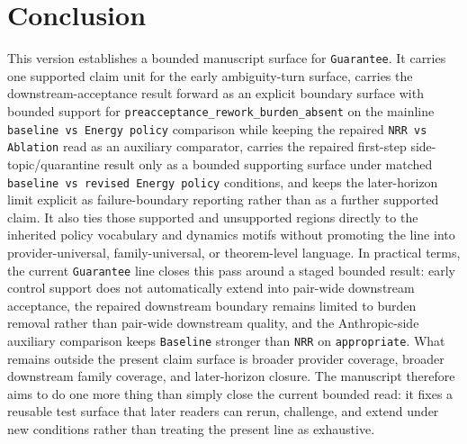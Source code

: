 \documentclass[11pt]{article}
\begin{document}
\section{Conclusion}

This version establishes a bounded manuscript surface for \texttt{Guarantee}.
It carries one supported claim unit for the early ambiguity-turn surface,
carries the downstream-acceptance result forward as an explicit boundary
surface with bounded support for
\texttt{preacceptance\_rework\_burden\_absent} on the mainline
\texttt{baseline vs Energy policy} comparison while keeping the repaired
\texttt{NRR vs Ablation} read as an auxiliary comparator, carries the repaired
first-step side-topic/quarantine result only as a bounded supporting surface
under matched \texttt{baseline vs revised Energy policy} conditions, and keeps
the later-horizon limit explicit as failure-boundary reporting rather than as
a further supported claim. It also ties those supported and unsupported regions
directly to the inherited policy vocabulary and dynamics motifs without
promoting the line into provider-universal, family-universal, or theorem-level
language. In practical terms, the current \texttt{Guarantee} line closes this
pass around a staged bounded result: early control support does not
automatically extend into pair-wide downstream acceptance, the repaired
downstream boundary remains limited to burden removal rather than pair-wide
downstream quality, and the Anthropic-side auxiliary comparison keeps
\texttt{Baseline} stronger than \texttt{NRR} on \texttt{appropriate}. What
remains outside the present claim
surface is broader provider coverage, broader downstream family coverage, and
later-horizon closure. The manuscript therefore aims to do one more thing than
simply close the current bounded read: it fixes a reusable test surface that
later readers can rerun, challenge, and extend under new conditions rather
than treating the present line as exhaustive.
\end{document}
